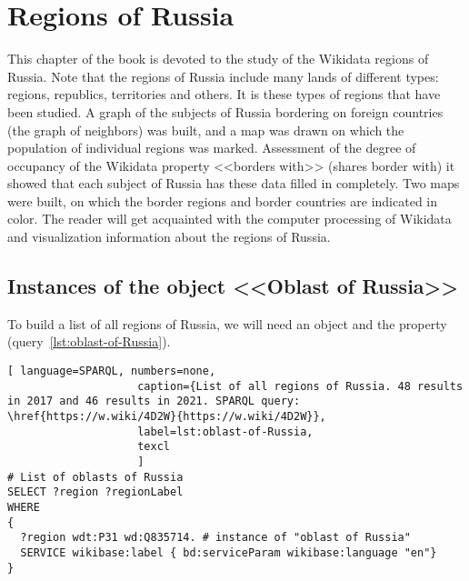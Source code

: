 \chapter{Regions of Russia}
\label{ch:oblast-of-Russia}


This chapter of the book is devoted to the study of the Wikidata regions of Russia. 
Note that the regions of Russia include many lands of different
types: regions, republics, territories and others. It is these types of regions that have been studied.
A graph of the subjects of Russia bordering
on foreign countries (the graph of neighbors) was built, and a map was drawn
on which the population of individual regions was marked. Assessment
of the degree of occupancy of the Wikidata property <<borders with>> (shares border with) 
it showed that each subject of Russia has these data filled in completely. Two maps were built, on which the border regions and border countries are indicated in color.
The reader will get acquainted with the computer processing of Wikidata and visualization 
information about the regions of Russia.

\label{question:q_subjects_of_Russia_3}

\section{Instances of the object <<Oblast of Russia>>}

To build a list of all regions of Russia, we will need an object 
 and the property 
(query~\protect\ref{lst:oblast-of-Russia}).

\begin{lstlisting}[ language=SPARQL, numbers=none,
                    caption={List of all regions of Russia. 48 results in 2017 and 46 results in 2021. SPARQL query: \href{https://w.wiki/4D2W}{https://w.wiki/4D2W}},
                    label=lst:oblast-of-Russia,
                    texcl 
                    ]
# List of oblasts of Russia
SELECT ?region ?regionLabel
WHERE
{
  ?region wdt:P31 wd:Q835714. # instance of "oblast of Russia"
  SERVICE wikibase:label { bd:serviceParam wikibase:language "en"}
}
\end{lstlisting}%

